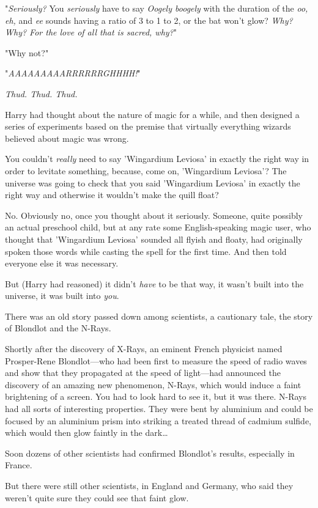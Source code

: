 "\emph{Seriously?} You \emph{seriously} have to say \emph{Oogely boogely} with 
the duration of the \emph{oo, eh,} and \emph{ee} sounds having a ratio of 3 to 
1 to 2, or the bat won't glow? \emph{Why? Why? For the love of all that is 
sacred, why?}"

"Why not?"

"\emph{AAAAAAAAARRRRRRGHHHH!}"

\emph{Thud. Thud. Thud.}

Harry had thought about the nature of magic for a while, and then designed a 
series of experiments based on the premise that virtually everything wizards 
believed about magic was wrong.

You couldn't \emph{really} need to say 'Wingardium Leviosa' in exactly the 
right way in order to levitate something, because, come on, 'Wingardium 
Leviosa'? The universe was going to check that you said 'Wingardium Leviosa' in 
exactly the right way and otherwise it wouldn't make the quill float?

No. Obviously no, once you thought about it seriously. Someone, quite possibly 
an actual preschool child, but at any rate some English-speaking magic user, 
who thought that 'Wingardium Leviosa' sounded all flyish and floaty, had 
originally spoken those words while casting the spell for the first time. And 
then told everyone else it was necessary.

But (Harry had reasoned) it didn't \emph{have} to be that way, it wasn't built 
into the universe, it was built into \emph{you}.

There was an old story passed down among scientists, a cautionary tale, the 
story of Blondlot and the N-Rays.

Shortly after the discovery of X-Rays, an eminent French physicist named 
Prosper-Rene Blondlot---who had been first to measure the speed of radio waves 
and show that they propagated at the speed of light---had announced the 
discovery of an amazing new phenomenon, N-Rays, which would induce a faint 
brightening of a screen. You had to look hard to see it, but it was there. 
N-Rays had all sorts of interesting properties. They were bent by aluminium and 
could be focused by an aluminium prism into striking a treated thread of 
cadmium sulfide, which would then glow faintly in the dark{\ldots}

Soon dozens of other scientists had confirmed Blondlot's results, especially in 
France.

But there were still other scientists, in England and Germany, who said they 
weren't quite sure they could see that faint glow.

